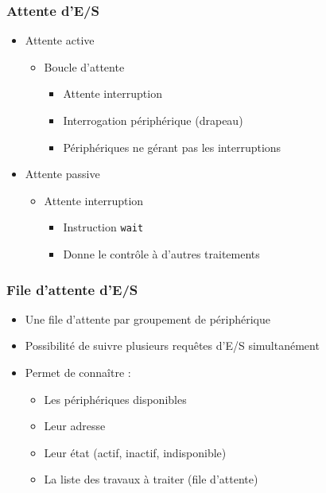 \begin{frame}
\frametitle{Attente d’E/S}
\begin{itemize}
\item Attente active
\begin{itemize}
\item Boucle d’attente
\begin{itemize}
\item Attente interruption
\item Interrogation périphérique (drapeau)
\item Périphériques ne gérant pas les interruptions
\end{itemize}
\end{itemize}
\item Attente passive
\begin{itemize}
\item Attente interruption
\begin{itemize}
\item Instruction \texttt{wait}
\item Donne le contrôle à d’autres traitements
\end{itemize}
\end{itemize}
\end{itemize}
\end{frame}


\begin{frame}
\frametitle{File d’attente d’E/S}
\begin{itemize}
\item Une file d'attente par groupement de périphérique
\item Possibilité de suivre plusieurs requêtes d’E/S simultanément
\item Permet de connaître :
\begin{itemize}
\item Les périphériques disponibles
\item Leur adresse
\item Leur état (actif, inactif, indisponible)
\item La liste des travaux à traiter (file d’attente)
\end{itemize}
\end{itemize}
\end{frame}



